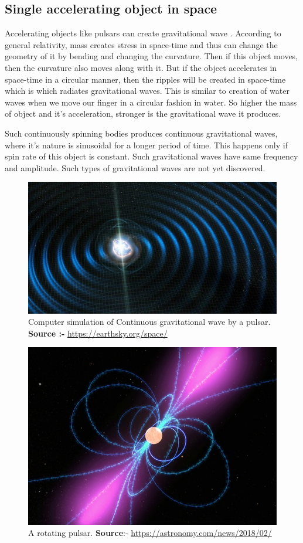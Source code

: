 \subsection{Single accelerating object in space}
 Accelerating objects like pulsars can create gravitational wave \cite{Creighton:2011zz}. According to general relativity, mass creates stress in space-time and thus can change the geometry of it by bending and changing the curvature. Then if this object moves, then the curvature also moves along with it. But if the object accelerates in space-time in a circular manner, then the ripples will be created in space-time which is which radiates gravitational waves. This is similar to creation of water waves when we move our finger in a circular fashion in water. So higher the mass of object and it's acceleration, stronger is the gravitational wave it produces.
 
 Such continuously spinning bodies produces continuous gravitational waves, where it's nature is sinusoidal for a longer period of time. This happens only if spin rate of this object is constant. Such gravitational waves have same frequency and amplitude. Such types of gravitational waves are not yet discovered.\\


\begin{figure}[h]
    \centering
    \includegraphics[scale = 0.35]{images.tex/continuous_gw.jpg}
    \caption{Computer simulation of Continuous gravitational wave by a pulsar. \\
    \textbf{Source :-} \url{https://earthsky.org/space/}}
\end{figure}

\begin{figure}[h]
    \centering
    \includegraphics[scale = 0.38]{images.tex/pulsar.jpg}
    \caption{A rotating pulsar.   \textbf{Source}:- \url{https://astronomy.com/news/2018/02/}}
\end{figure}

\pagebreak
